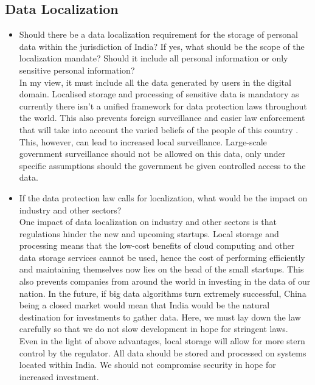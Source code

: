 \subsection{Data Localization}
\begin{itemize}
	\item Should there be a data localization requirement for the storage of personal data within the jurisdiction of India? If yes, what should be the scope of the localization mandate? Should it include all personal information or only sensitive personal information?
	\\
	In my view, it must include all the data generated by users in the digital domain. Localised storage and processing of sensitive data is mandatory as currently there isn't a unified framework for data protection laws throughout the world. This also prevents foreign surveillance and easier law enforcement that will take into account the varied beliefs of the people of this country \cite{usmicro}. 
	\\
	This, however, can lead to increased local surveillance. Large-scale government surveillance should not be allowed on this data, only under specific assumptions should the government be given controlled access to the data.
	\item If the data protection law calls for localization, what would be the impact on industry and other sectors?
	\\
	One impact of data localization on industry and other sectors is that regulations hinder the new and upcoming startups. Local storage and processing means that the low-cost benefits of cloud computing and other data storage services cannot be used, hence the cost of performing efficiently and maintaining themselves now lies on the head of the small startups. This also prevents companies from around the world in investing in the data of our nation. In the future, if big data algorithms turn extremely successful, China being a closed market would mean that India would be the natural destination for investments to gather data. Here, we must lay down the law carefully so that we do not slow development in hope for stringent laws.
	\\
	Even in the light of above advantages, local storage will allow for more stern control by the regulator. All data should be stored and processed on systems located within India. We should not compromise security in hope for increased investment.
\end{itemize}